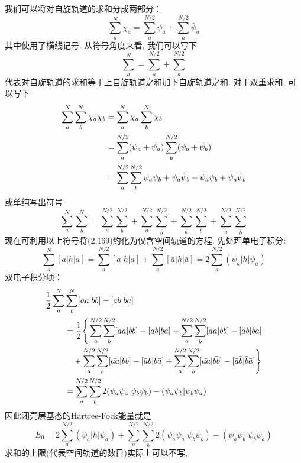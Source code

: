 我们可以将对自旋轨道的求和分成两部分：
\begin{equation}
\sum_{a}^{N} \chi_a = \sum_{a}^{N/2}\psi_a + \sum_{a}^{N/2}\bar{\psi}_a
\end{equation} 
其中使用了横线记号. 
从符号角度来看, 
我们可以写下
\begin{equation}
\sum_{a}^{N} = \sum_{a}^{N/2} + \sum_{a}^{N/2}
\end{equation}
代表对自旋轨道的求和等于上自旋轨道之和加下自旋轨道之和. 
对于双重求和, 
可以写下
\begin{align}
\sum_{a}^{N}\sum_{b}^{N}\chi_a\chi_b & = \sum_{a}^{N}\chi_a\sum_{b}^{N}\chi_b\notag\\
& = \sum_{a}^{N/2}(\psi_a + \bar{\psi}_a)\sum_{b}^{N/2}(\psi_b + \bar{\psi}_b) \notag\\ 
& = \sum_{a}^{N/2}\sum_{b}^{N/2}\psi_a\psi_b + \psi_a\bar{\psi}_b + \bar{\psi}_a{\psi}_b + \bar{\psi}_a\bar{\psi}_b 
\end{align}
或单纯写出符号
\begin{equation}
\sum_{a}^{N}\sum_{b}^{N} = \sum_{a}^{N/2}\sum_{b}^{N/2} + \sum_{a}^{N/2}\sum_{\bar{b}}^{N/2} + \sum_{\bar{a}}^{N/2}\sum_{b}^{N/2} + \sum_{\bar{a}}^{N/2}\sum_{\bar{b}}^{N/2}
\end{equation}
现在可利用以上符号将(2.169)约化为仅含空间轨道的方程. 
先处理单电子积分:
\begin{equation}
\sum_{a}^{N}[a|h|a] = \sum_{a}^{N/2}[a|h|a] + \sum_{a}^{N/2}[\bar{a}|h|\bar{a}] = 2 \sum_{a}^{N/2}(\psi_a|h|\psi_a)
\end{equation}
双电子积分项：
\begin{align}
\frac{1}{2}\sum_{a}^{N} & \sum_{b}^{N}[aa|bb] - [ab|ba]\notag\\
& = \frac{1}{2}\Bigg\{ \sum_{a}^{N/2}\sum_{b}^{N/2}[aa|bb]-[ab|ba] + \sum_{a}^{N/2}\sum_{b}^{N/2}[aa|\bar{bb}] -[a\bar{b}|\bar{b}a]\notag \\   
& \quad + \sum_{a}^{N/2}\sum_{b}^{N/2}[\bar{aa}|bb] - [\bar{a}b|b\bar{a}] + \sum_{a}^{N/2}\sum_{b}^{N/2}[\bar{aa}|\bar{bb}] - [\bar{a}\bar{b}|\bar{b}\bar{a}] \Bigg\}\notag\\
& = \sum_{a}^{N/2}\sum_{b}^{N/2} 2 (\psi_a\psi_a|\psi_b\psi_b) - (\psi_a\psi_b|\psi_b\psi_a)
\end{align}
因此闭壳层基态的Hartree-Fock能量就是
\begin{equation}
E_0 = 2 \sum_{a}^{N/2}(\psi_a|h|\psi_a) + \sum_{a}^{N/2}\sum_{b}^{N/2}2(\psi_a\psi_a|\psi_b\psi_b) - (\psi_a\psi_b|\psi_b\psi_a)
\end{equation}
求和的上限(代表空间轨道的数目)实际上可以不写, 
